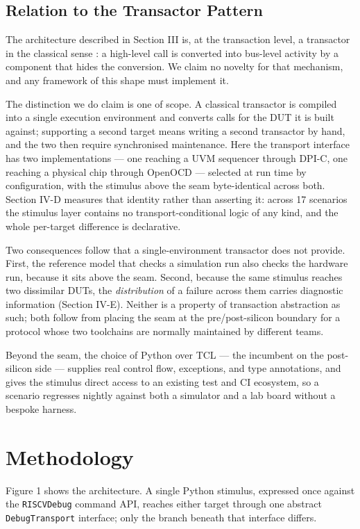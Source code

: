\documentclass[conference]{IEEEtran}
\begin{document}
\subsection{Relation to the Transactor Pattern}
The architecture described in Section III is, at the transaction level, a transactor in the classical sense \cite{b6}: a high-level call is converted into bus-level activity by a component that hides the conversion. We claim no novelty for that mechanism, and any framework of this shape must implement it.

The distinction we do claim is one of scope. A classical transactor is compiled into a single execution environment and converts calls for the DUT it is built against; supporting a second target means writing a second transactor by hand, and the two then require synchronised maintenance. Here the transport interface has two implementations --- one reaching a UVM sequencer through DPI-C, one reaching a physical chip through OpenOCD --- selected at run time by configuration, with the stimulus above the seam byte-identical across both. Section IV-D measures that identity rather than asserting it: across 17 scenarios the stimulus layer contains no transport-conditional logic of any kind, and the whole per-target difference is declarative.

Two consequences follow that a single-environment transactor does not provide. First, the reference model that checks a simulation run also checks the hardware run, because it sits above the seam. Second, because the same stimulus reaches two dissimilar DUTs, the \textit{distribution} of a failure across them carries diagnostic information (Section IV-E). Neither is a property of transaction abstraction as such; both follow from placing the seam at the pre/post-silicon boundary for a protocol whose two toolchains are normally maintained by different teams.

Beyond the seam, the choice of Python over TCL --- the incumbent on the post-silicon side --- supplies real control flow, exceptions, and type annotations, and gives the stimulus direct access to an existing test and CI ecosystem, so a scenario regresses nightly against both a simulator and a lab board without a bespoke harness.

\section{Methodology}
Figure 1 shows the architecture. A single Python stimulus, expressed once against the \texttt{RISCVDebug} command API, reaches either target through one abstract \texttt{DebugTransport} interface; only the branch beneath that interface differs.
\end{document}
